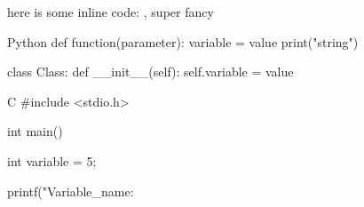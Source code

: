 \documentclass{SimpleLatex}
\begin{document}
\tableofcontents
here is some inline code: , super fancy


\pagebreak


\begin{CodeBlock}[10]{Python}
def function(parameter):
    variable = value
    print("string")

class Class:
    def __init__(self):
        self.variable = value
        
\end{CodeBlock}

\begin{CodeBlock}[5]{C}
#include <stdio.h>

int main() {
    int variable = 5;

    printf("Variable_name: %
}
\end{CodeBlock}

\end{document}
